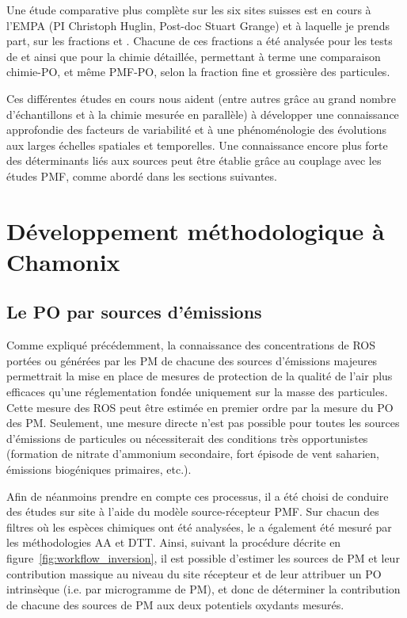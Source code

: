 Une étude comparative plus complète sur les six sites suisses est en cours à l'EMPA (PI
Christoph Huglin, Post-doc Stuart Grange) et à laquelle je prends part, sur les fractions
\PMdix{} et \PMdc. Chacune de ces fractions a été analysée pour les tests de \POAA{} et
\PODTT{} ainsi que pour la chimie détaillée, permettant à terme une comparaison
chimie-PO, et même PMF-PO, selon la fraction fine et grossière des particules.

Ces différentes études en cours nous aident (entre autres grâce au grand nombre
d'échantillons et à la chimie mesurée en parallèle) à développer une connaissance
approfondie des facteurs de variabilité et à une phénoménologie des évolutions aux larges
échelles spatiales et temporelles. Une connaissance encore plus forte des déterminants
liés aux sources peut être établie grâce au couplage avec les études PMF, comme abordé
dans les sections suivantes.

\clearpage
\section{Développement méthodologique à Chamonix}%
\label{ssub:développement_méthodologique_à_chamonix}

\subsection{Le PO par sources d'émissions}%
\label{sub:le_po_par_sources_d_émission}

Comme expliqué précédemment, la connaissance des concentrations
de ROS portées ou générées par les PM de chacune des sources d'émissions majeures
permettrait la mise en place de mesures de protection de la qualité de l'air plus
efficaces
qu'une réglementation fondée uniquement sur la masse des particules.  Cette mesure des ROS
peut être estimée en premier ordre par la mesure du PO des PM.  Seulement, une mesure
directe n'est pas possible pour toutes les sources d'émissions de particules ou
nécessiterait des conditions très opportunistes (formation de nitrate d'ammonium
secondaire, fort épisode de vent saharien, émissions biogéniques primaires, etc.).

Afin de néanmoins prendre en compte ces processus, il a été choisi de conduire des études
sur site à l'aide du modèle source-récepteur PMF. Sur chacun des filtres où les espèces
chimiques ont été analysées, le \POv{} a également été mesuré par les méthodologies AA et DTT. Ainsi, suivant
la procédure décrite en figure~\ref{fig:workflow_inversion}, il est possible d'estimer les
sources de PM et leur contribution massique au niveau du site récepteur et de leur attribuer un PO intrinsèque (i.e. par
microgramme de PM), et donc de déterminer la contribution de chacune des sources de PM aux
deux potentiels oxydants mesurés.

